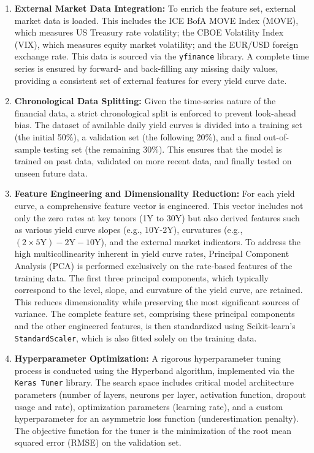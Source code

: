 {\begin{enumerate}
	\item \textbf{External Market Data Integration:}
	      To enrich the feature set, external market data is loaded. This includes the ICE BofA MOVE Index (MOVE), which measures US Treasury rate volatility; the CBOE Volatility Index (VIX), which measures equity market volatility; and the EUR/USD foreign exchange rate. This data is sourced via the \texttt{yfinance} library. A complete time series is ensured by forward- and back-filling any missing daily values, providing a consistent set of external features for every yield curve date.

	\item \textbf{Chronological Data Splitting:}
	      Given the time-series nature of the financial data, a strict chronological split is enforced to prevent look-ahead bias. The dataset of available daily yield curves is divided into a training set (the initial 50\%), a validation set (the following 20\%), and a final out-of-sample testing set (the remaining 30\%). This ensures that the model is trained on past data, validated on more recent data, and finally tested on unseen future data.

	\item \textbf{Feature Engineering and Dimensionality Reduction:}
	      For each yield curve, a comprehensive feature vector is engineered. This vector includes not only the zero rates at key tenors (1Y to 30Y) but also derived features such as various yield curve slopes (e.g., 10Y-2Y), curvatures (e.g., $(2 \times 5\text{Y}) - 2\text{Y} - 10\text{Y}$), and the external market indicators. To address the high multicollinearity inherent in yield curve rates, Principal Component Analysis (PCA) is performed exclusively on the rate-based features of the training data. The first three principal components, which typically correspond to the level, slope, and curvature of the yield curve, are retained. This reduces dimensionality while preserving the most significant sources of variance. The complete feature set, comprising these principal components and the other engineered features, is then standardized using Scikit-learn's \texttt{StandardScaler}, which is also fitted solely on the training data.

	\item \textbf{Hyperparameter Optimization:}
	      A rigorous hyperparameter tuning process is conducted using the Hyperband algorithm, implemented via the \texttt{Keras Tuner} library. The search space includes critical model architecture parameters (number of layers, neurons per layer, activation function, dropout usage and rate), optimization parameters (learning rate), and a custom hyperparameter for an asymmetric loss function (underestimation penalty). The objective function for the tuner is the minimization of the root mean squared error (RMSE) on the validation set.


\end{enumerate}}
